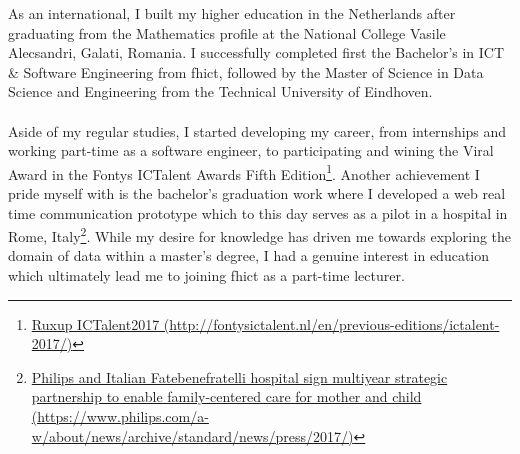 As an international, I built my higher education in the Netherlands after graduating from the Mathematics profile at the National College Vasile Alecsandri, Galati, Romania. 
I successfully completed first the Bachelor's in ICT \& Software Engineering from \acrshort{fhict}, followed by the Master of Science in Data Science and Engineering from the Technical University of Eindhoven.\\\\
Aside of my regular studies, I started developing my career, from internships and working part-time as a software engineer, to participating and wining the Viral Award in the Fontys ICTalent Awards Fifth Edition\footnote{ 
\href{http://fontysictalent.nl/en/previous-editions/ictalent-2017/}{Ruxup ICTalent2017 (http://fontysictalent.nl/en/previous-editions/ictalent-2017/)}}.
Another achievement I pride myself with is the bachelor's graduation work where I developed a web real time communication prototype which to this day serves as a pilot in a hospital in Rome, Italy\footnote{  
\href{https://www.philips.com/a-w/about/news/archive/standard/news/press/2017/20170726-philips-and-italian-fatebenefratelli-hospital-sign-multiyear-strategic-partnership-to-enable-family-centered-care-for-mother-and-child.html}{Philips and Italian Fatebenefratelli hospital sign multiyear strategic partnership to enable family-centered care for mother and child (https://www.philips.com/a-w/about/news/archive/standard/news/press/2017/)} }.
While my desire for knowledge has driven me towards exploring the domain of data within a master's degree, I had a genuine interest in education which ultimately lead me to joining \acrshort{fhict} as a part-time lecturer.